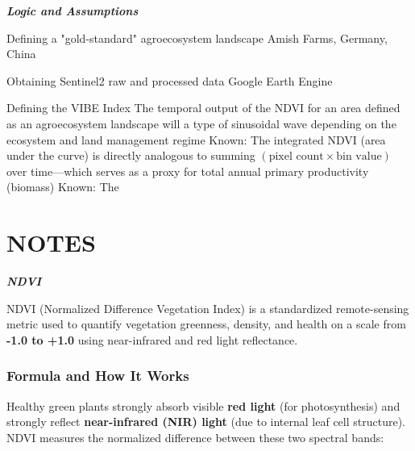 \documentclass[12pt, letterpaper]{article}
\begin{document}
\large
\begin{flushleft}
\textbf{\textit{Logic and Assumptions}}
\end{flushleft}
\normalsize

\begin{outline}[enumerate]
\1 Defining a "gold-standard" agroecosystem landscape
\2 Amish Farms, Germany, China

\1 Obtaining Sentinel2 raw and processed data
\2 Google Earth Engine

\1 Defining the VIBE Index
\2 The temporal output of the NDVI for an area defined as an agroecosystem landscape will a type of sinusoidal wave depending on the ecosystem and land management regime
\3 Known: The integrated NDVI (area under the curve) is directly analogous to summing $(\text{pixel count} \times \text{bin value})$ over time---which serves as a proxy for total annual primary productivity (biomass)
\3 Known: The


\end{outline}





\pagebreak

\thispagestyle{plain} 

\section{NOTES}

\bigskip
\LARGE
\begin{flushleft}
\textbf{\textit{NDVI}}
\end{flushleft}
\normalsize
NDVI (Normalized Difference Vegetation Index) is a standardized remote-sensing metric used to quantify vegetation greenness, density, and health on a scale from \textbf{-1.0 to +1.0} using near-infrared and red light reflectance.

\subsubsection*{Formula and How It Works}
Healthy green plants strongly absorb visible \textbf{red light} (for photosynthesis) and strongly reflect \textbf{near-infrared (NIR) light} (due to internal leaf cell structure). NDVI measures the normalized difference between these two spectral bands:
\end{document}
